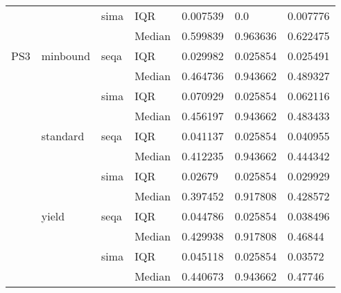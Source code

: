 \begin{tabular}{lllllll}
    &       & sima & IQR &  0.007539 &       0.0 &  0.007776 \\
    &       &      & Median &  0.599839 &  0.963636 &  0.622475 \\
PS3 & minbound & seqa & IQR &  0.029982 &  0.025854 &  0.025491 \\
    &       &      & Median &  0.464736 &  0.943662 &  0.489327 \\
    &       & sima & IQR &  0.070929 &  0.025854 &  0.062116 \\
    &       &      & Median &  0.456197 &  0.943662 &  0.483433 \\
    & standard & seqa & IQR &  0.041137 &  0.025854 &  0.040955 \\
    &       &      & Median &  0.412235 &  0.943662 &  0.444342 \\
    &       & sima & IQR &   0.02679 &  0.025854 &  0.029929 \\
    &       &      & Median &  0.397452 &  0.917808 &  0.428572 \\
    & yield & seqa & IQR &  0.044786 &  0.025854 &  0.038496 \\
    &       &      & Median &  0.429938 &  0.917808 &   0.46844 \\
    &       & sima & IQR &  0.045118 &  0.025854 &   0.03572 \\
    &       &      & Median &  0.440673 &  0.943662 &   0.47746 \\
\bottomrule
\end{tabular}
